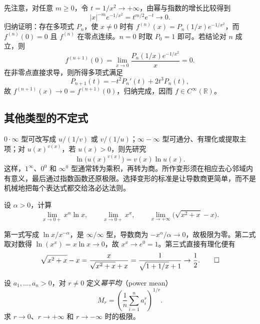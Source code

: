 \begin{solve}
先注意，对任意 $m\geq0$，令 $t=1/x^2\to+\infty$，由幂与指数的增长比较得到
\[
    |x|^{-m}e^{-1/x^2}=t^{m/2}e^{-t}\to0.
\]
归纳证明：存在多项式 $P_n$，使 $x\neq0$ 时有 $f^{(n)}(x)=P_n(1/x)e^{-1/x^2}$，而 $f^{(n)}(0)=0$ 且 $f^{(n)}$ 在零点连续。$n=0$ 时取 $P_0=1$ 即可。若结论对 $n$ 成立，则
\[
    f^{(n+1)}(0)=\lim_{x\to0}\frac{P_n(1/x)e^{-1/x^2}}x=0.
\]
在非零点直接求导，则所得多项式满足
\[
    P_{n+1}(t)=-t^2P_n'(t)+2t^3P_n(t),
\]
故 $f^{(n+1)}(x)\to0=f^{(n+1)}(0)$，归纳完成，因而 $f\in C^\infty(\mathbb{R})$。
\end{solve}

\subsection{其他类型的不定式}
\label{subsec:other-indeterminate-forms}

$0\cdot\infty$ 型可改写成 $u/(1/v)$ 或 $v/(1/u)$；$\infty-\infty$ 型可通分、有理化或提取主项；对 $u(x)^{v(x)}$，若 $u(x)>0$，则先研究
\[
    \ln\bigl(u(x)^{v(x)}\bigr)=v(x)\ln u(x).
\]
这样，$1^\infty$、$0^0$ 和 $\infty^0$ 型通常转为乘积，再转为商。所作变形须在相应去心邻域内有意义，最后通过指数函数还原极限。选择变形的标准是让导数商更简单，而不是机械地把每个表达式都交给洛必达法则。

\begin{example}
\label{ex:other-indeterminate-form-transformations}
设 $\alpha>0$，计算
\[
    \lim_{x\to0+}x^\alpha\ln x,
    \qquad \lim_{x\to0+}x^x,
    \qquad \lim_{x\to+\infty}\bigl(\sqrt{x^2+x}-x\bigr).
\]
\end{example}

\begin{solve}
第一式写成 $\ln x/x^{-\alpha}$，是 $\infty/\infty$ 型，导数商为 $-x^\alpha/\alpha\to0$，故极限为零。第二式取对数得 $\ln(x^x)=x\ln x\to0$，故 $x^x\to e^0=1$。第三式直接有理化便有
\[
    \sqrt{x^2+x}-x
    =\frac{x}{\sqrt{x^2+x}+x}
    =\frac1{\sqrt{1+1/x}+1}\to\frac12.
    \qedhere
\]
\end{solve}

\begin{example}
\label{ex:power-means-parameter-limits}
设 $a_1,\ldots,a_n>0$，对 $r\neq0$ 定义\emph{幂平均}（power mean）
\[
    M_r=\left(\frac1n\sum_{i=1}^n a_i^r\right)^{1/r}.
\]
求 $r\to0$、$r\to+\infty$ 和 $r\to-\infty$ 时的极限。
\end{example}

